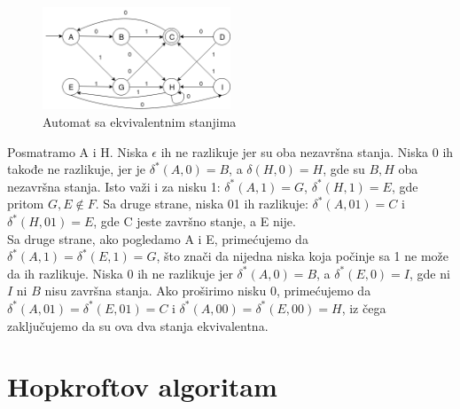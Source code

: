 \documentclass[a4paper]{article}
\begin{document}
\begin{figure}[H]
\centering
\includegraphics[width=0.5\textwidth]{Slike/autom1.png}
\caption{\label{fig:slika1}Automat sa ekvivalentnim stanjima}
\end{figure}

\noindent Posmatramo A i H. Niska $\epsilon$ ih ne razlikuje jer su oba nezavršna stanja. Niska 0 ih takođe ne razlikuje, jer je $\delta^{*}(A, 0) = B$, a $\delta(H, 0) = H$, gde su $B, H$ oba nezavršna stanja. Isto važi i za nisku 1: $\delta^{*}(A, 1) = G$, $\delta^{*}(H, 1) = E$, gde pritom $G, E \notin F$. Sa druge strane, niska 01 ih razlikuje: $\delta^{*}(A, 01) = C$ i $\delta^{*}(H, 01) = E$, gde C jeste završno stanje, a E nije. \\
Sa druge strane, ako pogledamo A i E, primećujemo da $\delta^{*}(A, 1) = \delta^{*}(E, 1) = G$, što znači da nijedna niska koja počinje sa 1 ne može da ih razlikuje. Niska 0 ih ne razlikuje jer $\delta^{*}(A, 0) = B$, a $\delta^{*}(E, 0) = I$, gde ni $I$ ni $B$ nisu završna stanja. Ako proširimo nisku 0, primećujemo da $\delta^{*}(A, 01) = \delta^{*}(E, 01) = C$ i $\delta^{*}(A, 00) = \delta^{*}(E, 00) = H$, iz čega zaključujemo da su ova dva stanja ekvivalentna. \par


\section{Hopkroftov algoritam}
\end{document}
